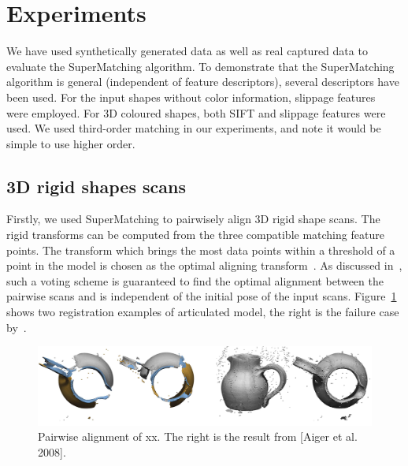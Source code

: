 \section{Experiments}
\label{sec:experiments}

We have used synthetically generated data as well as real captured data to evaluate the SuperMatching algorithm.
To demonstrate that the SuperMatching algorithm is general (independent of feature descriptors), several descriptors have been used.
For the input shapes without color information, slippage features~\cite{Bokeloh08} were employed.
For 3D coloured shapes, both SIFT and slippage features were used.
We used third-order matching in our experiments, and note it would be simple to use higher order.

\subsection{3D rigid shapes scans}
\label{subsec:3DRigid}

Firstly, we used SuperMatching to pairwisely align 3D rigid shape scans.
The rigid transforms can be computed from the three compatible matching feature points.
The transform which brings the most data points within a threshold of a point in the model is chosen as the optimal aligning transform~\cite{Huttenlocher90}.
As discussed in~\cite{Gelfand05}, such a voting scheme is guaranteed to find the optimal alignment between the pairwise scans and is independent of the initial pose of the input scans.
Figure~\ref{fig:3DPair} shows two registration examples of articulated model, the right is the failure case by~\cite{Aiger08}.

\begin{figure}[tb]
\centering
  \includegraphics[width=0.99\linewidth]{figures/rigidCMP.jpg}
  \caption{Pairwise alignment of xx. The right is the result from [Aiger et al. 2008]. }
\label{fig:3DPair}
\end{figure}

